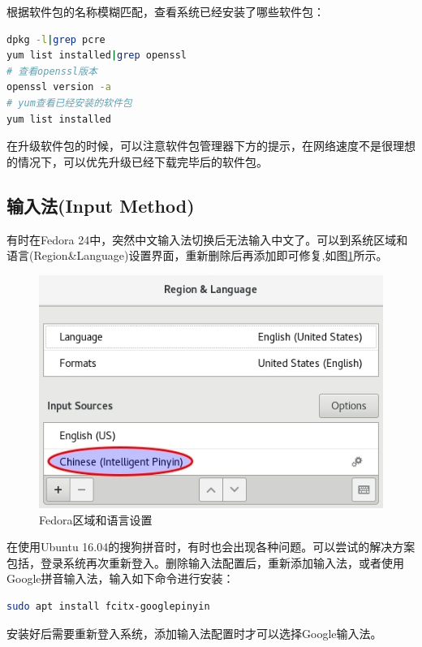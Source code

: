 \documentclass[letter]{book}
\begin{document}
根据软件包的名称模糊匹配，查看系统已经安装了哪些软件包：

\begin{lstlisting}[language=Bash]
dpkg -l|grep pcre
yum list installed|grep openssl
# 查看openssl版本
openssl version -a
# yum查看已经安装的软件包
yum list installed
\end{lstlisting}

在升级软件包的时候，可以注意软件包管理器下方的提示，在网络速度不是很理想的情况下，可以优先升级已经下载完毕后的软件包。

\subsection{输入法(Input Method)}

有时在Fedora 24中，突然中文输入法切换后无法输入中文了。可以到系统区域和语言(Region\&Language)设置界面，重新删除后再添加即可修复,如图\ref{fig:regionandlanguagesetting}所示。

\begin{figure}[htbp]
	\centering
	\includegraphics[scale=0.6]{regionandlanguagesetting.jpg}
	\caption{Fedora区域和语言设置}
	\label{fig:regionandlanguagesetting}
\end{figure}

在使用Ubuntu 16.04的搜狗拼音时，有时也会出现各种问题。可以尝试的解决方案包括，登录系统再次重新登入。删除输入法配置后，重新添加输入法，或者使用Google拼音输入法，输入如下命令进行安装：

\begin{lstlisting}[language=Bash]
sudo apt install fcitx-googlepinyin
\end{lstlisting}

安装好后需要重新登入系统，添加输入法配置时才可以选择Google输入法。
\end{document}
